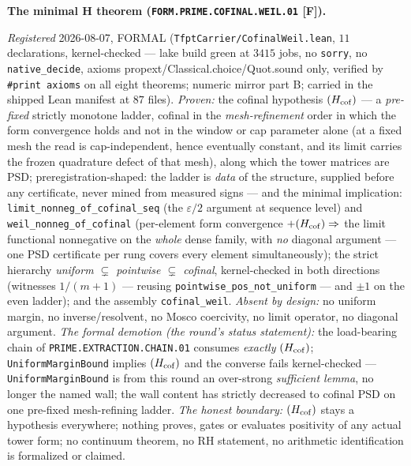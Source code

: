 \documentclass[11pt,a4paper]{article}
\begin{document}
\par\smallskip\noindent\textbf{The minimal H theorem
(\texttt{FORM.PRIME.\allowbreak COFINAL.\allowbreak WEIL.01}
[F]).}
{\sloppy
\emph{Registered} 2026-08-07, FORMAL
(\texttt{TfptCarrier/CofinalWeil.lean}, $11$ declarations,
kernel-checked --- lake build green at $3415$ jobs, no
\texttt{sorry}, no \texttt{native\_decide}, axioms
propext/Classical.choice/Quot.sound only, verified by
\texttt{\#print axioms} on all eight theorems; numeric mirror
 part B; carried in
the shipped Lean manifest at $87$ files).  \emph{Proven:} the
cofinal hypothesis $(H_{\rm cof})$ --- a \emph{pre-fixed}
strictly monotone ladder, cofinal in the \emph{mesh-refinement}
order in which the form convergence holds and not in the window
or cap parameter alone (at a fixed mesh the read is
cap-independent, hence eventually constant, and its limit
carries the frozen quadrature defect of that mesh), along which
the tower matrices are PSD;
preregistration-shaped: the ladder is \emph{data} of the
structure, supplied before any certificate, never mined from
measured signs --- and the minimal implication:
\texttt{limit\_nonneg\_of\_cofinal\_seq} (the $\varepsilon/2$
argument at sequence level) and
\texttt{weil\_nonneg\_of\_cofinal} (per-element form convergence
$+ (H_{\rm cof}) \Rightarrow$ the limit functional nonnegative
on the \emph{whole} dense family, with \emph{no} diagonal
argument --- one PSD certificate per rung covers every element
simultaneously); the strict hierarchy
\emph{uniform $\subsetneq$ pointwise $\subsetneq$ cofinal},
kernel-checked in both directions (witnesses $1/(m{+}1)$ ---
reusing \texttt{pointwise\_pos\_not\_uniform} --- and $\pm1$ on
the even ladder); and the assembly \texttt{cofinal\_weil}.
\emph{Absent by design:} no uniform margin, no
inverse/resolvent, no Mosco coercivity, no limit operator, no
diagonal argument.  \emph{The formal demotion (the round's
status statement):} the load-bearing chain of
\texttt{PRIME.EXTRACTION.CHAIN.01} consumes \emph{exactly}
$(H_{\rm cof})$; \texttt{UniformMarginBound} implies
$(H_{\rm cof})$ and the converse fails kernel-checked ---
\texttt{UniformMarginBound} is from this round an over-strong
\emph{sufficient lemma}, no longer the named wall; the wall
content has strictly decreased to cofinal PSD on one pre-fixed
mesh-refining ladder.  \emph{The honest boundary:}
$(H_{\rm cof})$ stays a
hypothesis everywhere; nothing proves, gates or evaluates
positivity of any actual tower form; no continuum theorem, no
RH statement, no arithmetic identification is formalized or
claimed.\par}
\end{document}
